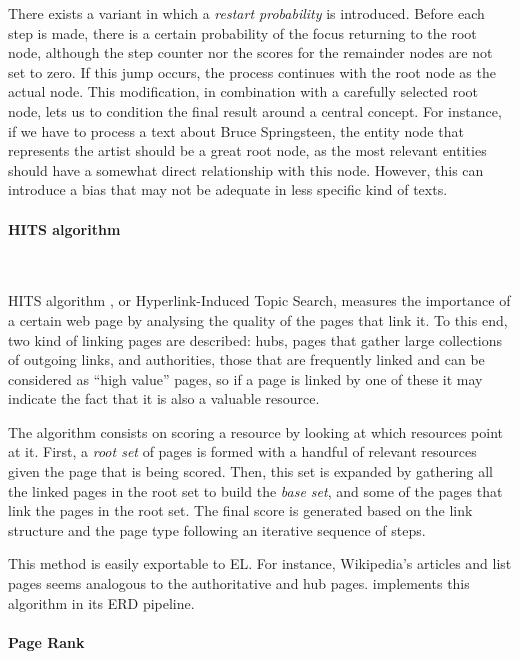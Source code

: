 There exists a variant in which a \emph{restart probability} is introduced. Before each step is made, there is a certain probability of the focus returning to the root node, although the step counter nor the scores for the remainder nodes are not set to zero. If this jump occurs, the process continues with the root node as the actual node. This modification, in combination with a carefully selected root node, lets us to condition the final result around a central concept. For instance, if we have to process a text about Bruce Springsteen, the entity node that represents the artist should be a great root node, as the most relevant entities should have a somewhat direct relationship with this node. However, this can introduce a bias that may not be adequate in less specific kind of texts.

\paragraph{HITS algorithm}~

HITS algorithm \cite{kleinberg1999}, or Hyperlink-Induced Topic Search, measures the importance of a certain web page by analysing the quality of the pages that link it. To this end, two kind of linking pages are described: hubs, pages that gather large collections of outgoing links, and authorities, those that are frequently linked and can be considered as ``high value'' pages, so if a page is linked by one of these it may indicate the fact that it is also a valuable resource.

The algorithm consists on scoring a resource by looking at which resources point at it. First, a \emph{root set} of pages is formed with a handful of relevant resources given the page that is being scored. Then, this set is expanded by gathering all the linked pages in the root set to build the \emph{base set}, and some of the pages that link the pages in the root set. The final score is generated based on the link structure and the page type following an iterative sequence of steps.

This method is easily exportable to EL. For instance, Wikipedia's articles and list pages seems analogous to the authoritative and hub pages. \cite{usbeck2014agnostic} implements this algorithm in its ERD pipeline.

\paragraph{Page Rank}~

